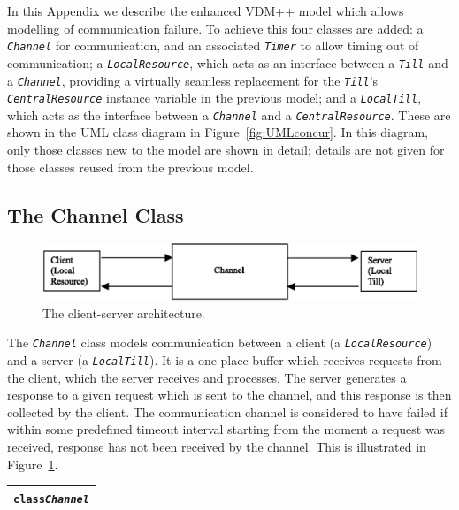 \documentclass[\pformat,12pt,twoside]{article}
\newenvironment{VDMgray}%
{\begin{tabular}{|G|}\hline\small\begin{alltt}}%
{\end{alltt}\normalsize\\
 \hline\end{tabular}}
\begin{document}
In this Appendix we describe the enhanced VDM++ model which allows
modelling of communication failure. To achieve this four classes are
added: a \texttt{\emph{Channel}} for communication, and an associated
\texttt{\emph{Timer}} to allow timing out of communication; a
\texttt{\emph{LocalResource}}, which acts as an interface between a
\texttt{\emph{Till}} and a \texttt{\emph{Channel}}, providing a
virtually seamless replacement for the \texttt{\emph{Till}}'s
\texttt{\emph{CentralResource}} instance variable in the previous
model; and a \texttt{\emph{LocalTill}}, which acts as the interface
between a \texttt{\emph{Channel}} and a
\texttt{\emph{CentralResource}}.  These are shown in the UML class diagram
in Figure~\ref{fig:UMLconcur}. In this diagram, only those classes new to the model are shown
in detail; details  are not given for those classes reused from the
previous model.

\subsection{The Channel Class}


\begin{figure}[htbp]
\begin{center}
\includegraphics[width=5in]{channel2}
\caption{The client-server architecture.\label{fig:channel}}
\end{center}
\end{figure}

The \texttt{\emph{Channel}} class models communication between a
client (a \texttt{\emph{LocalResource}}) and a server (a
\texttt{\emph{LocalTill}}). It is a one place buffer which receives
requests from the client, which the server receives and processes. The
server generates a response to a given request which is sent to the
channel, and this response is then collected by the client. The
communication channel is considered to have failed if within some
predefined timeout interval starting from the moment a request was
received, response has not been received by the channel. This is
illustrated in Figure~\ref{fig:channel}.

\begin{VDMgray}
\textbf{class} \textit{Channel}
\end{VDMgray}
\end{document}
